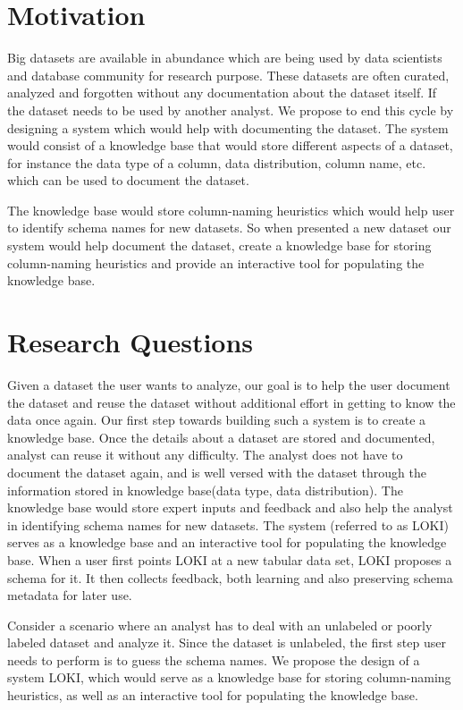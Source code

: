 \documentclass{vldb}
\begin{document}
\section{Motivation}
Big datasets are available in abundance which are being used by data scientists and database community for research purpose. These datasets are often curated, analyzed and forgotten without any documentation about the dataset itself. If the dataset needs to be used by another analyst. We propose to end this cycle by designing a system which would help with documenting the dataset. The system would consist of a knowledge base that would store different aspects of a dataset, for instance the data type of a column, data distribution, column name, etc. which can be used to document the dataset.

The knowledge base would store column-naming heuristics which would help user to identify schema names for new datasets. So when presented a new dataset our system would help document the dataset, create a knowledge base for storing column-naming heuristics and provide an interactive tool for populating the knowledge base.


\section{Research Questions}
Given a dataset the user wants to analyze, our goal is to help the user document the dataset and reuse the dataset without additional effort in getting to know the data once again. Our first step towards building such a system is to create a knowledge base. Once the details about a dataset are stored and documented, analyst can reuse it without any difficulty. The analyst does not have to document the dataset again, and is well versed with the dataset through the information stored in knowledge base(data type, data distribution). The knowledge base would store expert inputs and feedback and also help the analyst in identifying schema names for new datasets. The system (referred to as LOKI) serves as a knowledge base and an interactive tool for populating the knowledge base. When a user first points LOKI at a new tabular data set, LOKI proposes a schema for it. It then collects feedback, both learning and also preserving schema metadata for later use.

Consider a scenario where an analyst has to deal with an unlabeled or poorly labeled dataset and analyze it. Since the dataset is unlabeled, the first step user needs to perform is to guess the schema names. We propose the design of a system LOKI, which would serve as a knowledge base for storing column-naming heuristics, as well as an interactive tool for populating the knowledge base.
\end{document}
